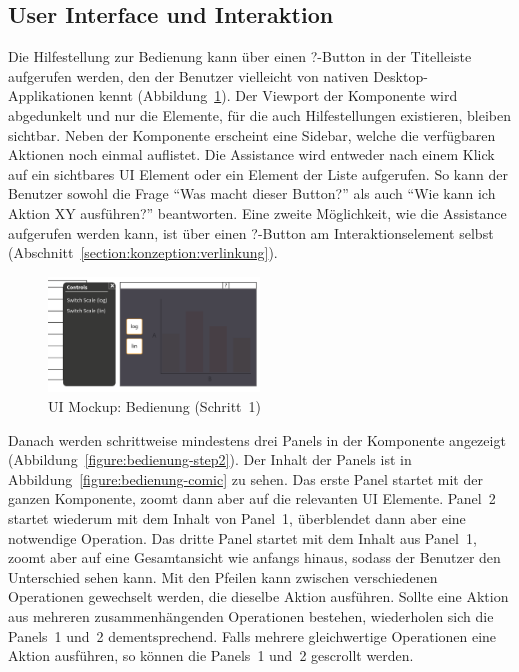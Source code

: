 \documentclass[
	headsepline,
	footsepline,
	fontsize=12pt,
	bibliography=totoc
]{scrbook}
\begin{document}
\subsection{User Interface und Interaktion}
\label{section:konzeption:bedienung:ui}


Die Hilfestellung zur Bedienung kann über einen ?-Button in der Titelleiste aufgerufen werden, den der Benutzer vielleicht von nativen Desktop-Applikationen kennt (Abbildung~\ref{figure:bedienung-step1}). Der Viewport der Komponente wird abgedunkelt und nur die Elemente, für die auch Hilfestellungen existieren, bleiben sichtbar. Neben der Komponente erscheint eine Sidebar, welche die verfügbaren Aktionen noch einmal auflistet. Die Assistance wird entweder nach einem Klick auf ein sichtbares UI Element oder ein Element der Liste aufgerufen. So kann der Benutzer sowohl die Frage \enquote{Was macht dieser Button?} als auch \enquote{Wie kann ich Aktion XY ausführen?} beantworten. Eine zweite Möglichkeit, wie die Assistance aufgerufen werden kann, ist über einen ?-Button am Interaktionselement selbst (Abschnitt~\ref{section:konzeption:verlinkung}).

\begin{figure}[htbp]
   \centering
   \includegraphics[width=0.5\textwidth]{images/konzeption-bedienung-step1.png}
   \caption{UI Mockup: Bedienung (Schritt~1)}
   \label{figure:bedienung-step1}
\end{figure}

Danach werden schrittweise mindestens drei Panels in der Komponente angezeigt (Abbildung~\ref{figure:bedienung-step2}). Der Inhalt der Panels ist in Abbildung~\ref{figure:bedienung-comic} zu sehen. Das erste Panel startet mit der ganzen Komponente, zoomt dann aber auf die relevanten UI Elemente. Panel~2 startet wiederum mit dem Inhalt von Panel~1, überblendet dann aber eine notwendige Operation. Das dritte Panel startet mit dem Inhalt aus Panel~1, zoomt aber auf eine Gesamtansicht wie anfangs hinaus, sodass der Benutzer den Unterschied sehen kann. Mit den Pfeilen kann zwischen verschiedenen Operationen gewechselt werden, die dieselbe Aktion ausführen. Sollte eine Aktion aus mehreren zusammenhängenden Operationen bestehen, wiederholen sich die Panels~1 und~2 dementsprechend. Falls mehrere gleichwertige Operationen eine Aktion ausführen, so können die Panels~1 und~2 gescrollt werden.
\end{document}
